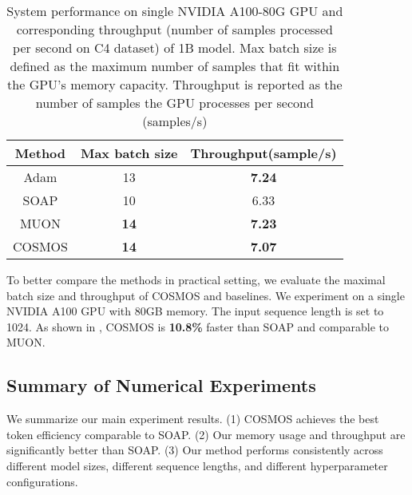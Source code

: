\begin{table}[htb!]
    \caption{System performance on single NVIDIA A100-80G GPU and corresponding throughput (number of samples processed per second on C4 dataset) of 1B model. Max batch size is defined as the maximum number of samples that fit within the GPU’s memory capacity. Throughput is reported as the number of samples the GPU processes per second (samples/s)}
    \label{tab:exp-throughput}
    \centering
    \begin{tabular}{c|cc}
    \toprule
    Method & Max batch size & Throughput(sample/s)  \\
    \hline                   
    Adam & 13   &\textbf{7.24} \\
    SOAP & 10  &6.33   \\
    MUON &\textbf{14} &\textbf{7.23}\\
    \hline
    COSMOS &\textbf{14} & \textbf{7.07}\\
    \bottomrule
    \end{tabular}
\end{table}

\vskip2pt
To better compare the methods in practical setting, we evaluate the maximal batch size and throughput of COSMOS and baselines. 
We experiment on a single NVIDIA A100 GPU with 80GB memory. The input sequence length is set to 1024. 
As shown in , COSMOS is \textbf{10.8\% }faster than SOAP and comparable to MUON.

\subsection{Summary of Numerical Experiments}
We summarize our main experiment results. 
(1) COSMOS achieves the best token efficiency comparable to SOAP. 
(2) Our memory usage and throughput are significantly better than SOAP. 
(3) Our method performs consistently across different model sizes, different sequence lengths, and different hyperparameter configurations. 